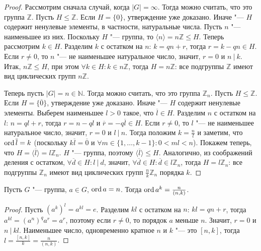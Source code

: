 \begin{proof}
	Рассмотрим сначала случай, когда $|G| = \infty$. Тогда можно считать, что это группа $\mathbb{Z}$. Пусть $H \le \mathbb{Z}$. Если $H = \{0\}$, утверждение уже доказано. Иначе "--- $H$ содержит ненулевые элементы, в частности, натуральные числа. Пусть $n$ "--- наименьшее из них. Поскольку $H$ "--- группа, то $\langle n \rangle = n\mathbb{Z} \le H$. Теперь рассмотрим $k \in H$. Разделим $k$ с остатком на $n$: $k = qn + r$, тогда $r = k - qn \in H$. Если $r \ne 0$, то $n$ "--- не наименьшее натуральное число, значит, $r = 0$ и $n~|~k$. Итак, $n\mathbb{Z} \le H$, при этом $\forall k \in H: k \in n\mathbb{Z}$, тогда $H = n\mathbb{Z}$: все подгруппы $\mathbb{Z}$ имеют вид циклических групп $n\mathbb{Z}$.
	
	Теперь пусть $|G| = n \in \mathbb{N}$. Тогда можно считать, что это группа $\mathbb{Z}_n$. Пусть $H \le \mathbb{Z}$. Если $H = \{\overline{0}\}$, утверждение уже доказано. Иначе "--- $H$ содержит ненулевые элементы. Выберем наименьшее $l > 0$ такое, что $\overline{l} \in H$. Разделим $n$ с остатком на $l$: $n = ql + r$, тогда $r = n - ql$ и $\overline{r} = -q\overline{l} \in H$. Если $r \ne 0$, то $l$ "--- не наименьшее натуральное число, значит, $r = 0$ и $l~|~n$. Тогда положим $k = \frac{n}{l}$ и заметим, что $\operatorname{ord}{\overline{l}} = k$ (поскольку $k\overline{l} = \overline{0}$ и $\forall m \in \{1, \dots, k - 1\}: 0 < ml < n$). Покажем теперь, что $H = \langle\overline{l}\rangle = l\mathbb{Z}_n$. $H$ "--- группа, поэтому $\langle\overline{l}\rangle \le H$. Аналогично, из соображений деления с остатком, $\forall \overline{d} \in H: l~|~d$, значит, $\forall \overline{d} \in H: \overline{d} \in l\mathbb{Z}_n$, тогда $H = l\mathbb{Z}_n$: все подгруппы $\mathbb{Z}_n$ имеют вид циклических групп $\frac{n}{k}\mathbb{Z}_n$ порядка $k$.
\end{proof}

\begin{proposition}
	Пусть $G$ "--- группа, $a \in G$, $\operatorname{ord}{a} = n$. Тогда $\operatorname{ord}{a^k} = \frac{n}{(n, k)}$.
\end{proposition}

\begin{proof}
	Пусть $(a^k)^l = a^{kl} = e$. Разделим $kl$ с остатком на $n$: $kl = qn + r$, тогда $a^{kl} = (a^{n})^qa^r = a^r$, поэтому если $r \ne 0$, то порядок $a$ меньше $n$. Значит, $r = 0$ и $n~|~kl$. Наименьшее число, одновременно кратное $n$ и $k$ "--- это $[n, k]$, тогда $l = \frac{[n, k]}{k} = \frac{n}{(n, k)}$.
\end{proof}

